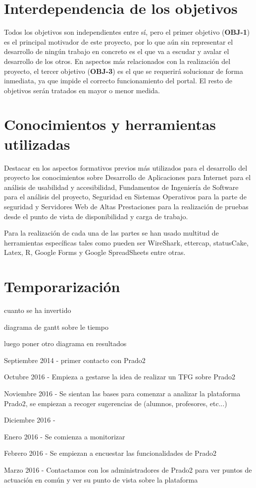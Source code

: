 \section{Interdependencia de los objetivos}

Todos los objetivos son independientes entre sí, pero el primer objetivo (\textbf{OBJ-1}) es el principal motivador de este proyecto, por lo que aún sin representar el desarrollo de ningún trabajo en concreto es el que va a escudar y avalar el desarrollo de los otros. En aspectos más relacionados con la realización del proyecto, el tercer objetivo (\textbf{OBJ-3}) es el que se requerirá solucionar de forma inmediata, ya que impide el correcto funcionamiento del portal. El resto de objetivos serán tratados en mayor o menor medida.

\section{Conocimientos y herramientas utilizadas}

\bigskip
Destacar en los aspectos formativos previos más utilizados para el desarrollo del proyecto los conocimientos sobre Desarrollo de Aplicaciones para Internet para el análisis de usabilidad y accesibilidad, Fundamentos de Ingeniería de Software para el análisis del proyecto, Seguridad en Sistemas Operativos para la parte de seguridad y Servidores Web de Altas Prestaciones para la realización de pruebas desde el punto de vista de disponibilidad y carga de trabajo.

Para la realización de cada una de las partes se han usado multitud de herramientas específicas tales como pueden ser WireShark, ettercap, statusCake, Latex, R, Google Forms y Google SpreadSheets entre otras. 


\section{Temporarización}

cuanto se ha invertido

diagrama de gantt sobre le tiempo

luego poner otro diagrama en resultados


Septiembre 2014 - primer contacto con Prado2


Octubre 2016 - Empieza a gestarse la idea de realizar un TFG sobre Prado2

Noviembre 2016 - Se sientan las bases para comenzar a analizar la plataforma Prado2, se empiezan a recoger sugerencias de (alumnos, profesores, etc...)

Diciembre 2016 - 

Enero 2016 - Se comienza a monitorizar

Febrero 2016 - Se empiezan a encuestar las funcionalidades de Prado2

Marzo 2016 - Contactamos con los administradores de Prado2 para ver puntos de actuación en común y ver su punto de vista sobre la plataforma





